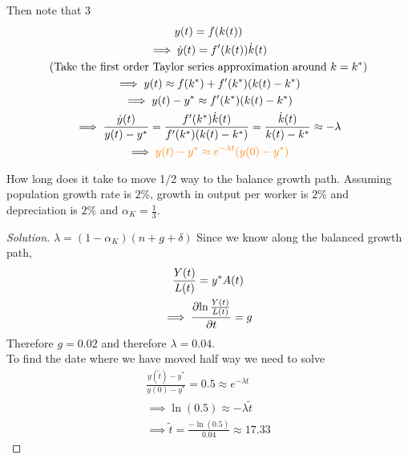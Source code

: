 \documentclass[11pt]{article}
\begin{document}
	    Then note that 3
	    \begin{gather*}
	        y(t) = f(k(t)) \\
	        \implies \dot{y}(t) = f'(k(t))\dot{k}(t) \\
	        \text{{(Take the first order Taylor series approximation around $k=k^*$)}} \\
	        \implies y(t) \approx f(k^*) + f'(k^*) (k(t)-k^*) \\
	        \implies y(t) - y^* \approx f'(k^*)(k(t) - k^*) \\
	        \implies \frac{\dot{y}(t)}{y(t) - y^*} = \frac{f'(k^*)\dot{k}(t)}{f'(k^*)(k(t) - k^*)} = \frac{\dot{k}(t)}{k(t) - k^*} \approx - \lambda \\
	       \implies \textcolor{orange}{
	       		y(t) - y^* \approx e^{- \lambda t} (y(0) - y^*)
	       }
	    \end{gather*}
	    
	    \begin{example}
	        How long does it take to move 1/2 way to the balance growth path. Assuming population growth rate is $2\%$, growth in output per worker is $2\%$ and depreciation is $2\%$ and  $\alpha_K = \frac{1}{3}$.
	        \begin{proof}[Solution]
	            $\lambda = (1 - \alpha_K)(n + g + \delta)$ 
	            Since we know along the balanced growth path, \begin{gather*}
	                \frac{Y(t)}{L(t)} = y^* A(t) \\
	                \implies \frac{\partial{\ln{\frac{Y(t)}{L(t)}}}}{\partial{t}} = g
	            \end{gather*}
	            Therefore $g = 0.02$ and therefore $\lambda = 0.04$. \\
	            To find the date where we have moved half way we need to solve 
	            \begin{gather*}
	                \frac{y(\tilde{t}) - y^*}{y(0) - y^*} = 0.5 \approx e^{-\lambda t}\\
	                \implies \ln(0.5) \approx -\lambda \tilde{t} \\
	                \implies \tilde{t} = \frac{-\ln(0.5)}{0.04} \approx 17.33
	            \end{gather*}
	        \end{proof}
	    \end{example}
	    
\end{document}
